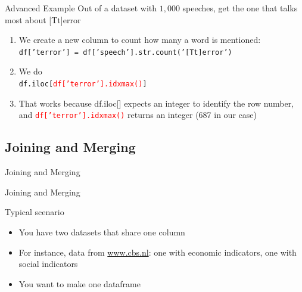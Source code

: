 \documentclass{beamer}
\begin{document}
\begin{frame}{Advanced Example}
Out of a dataset with $1,000$ speeches, get the one that talks most about [Tt]error
\begin{enumerate}[<+->]
	\item We create a new column to count how many a word is mentioned: \\ 
	\texttt{df['terror'] = df['speech'].str.count('[Tt]error')}
	\item We do \\ \texttt{df.iloc[\textcolor{red}{df['terror'].idxmax()}]}
	\item That works because df.iloc[] expects an integer to identify the row number, and \texttt{\textcolor{red}{df['terror'].idxmax()}} returns an integer (687 in our case)
\end{enumerate}

\end{frame}

{
	\begin{frame}[plain]
\end{frame}
}


\subsection{Joining and Merging}
\begin{frame}[plain]
Joining and Merging
\end{frame}


\begin{frame}{Joining and Merging}
\begin{block}{Typical scenario}
	\begin{itemize}
		\item You have two datasets that share one column
		\item For instance, data from \url{www.cbs.nl}: one with economic indicators, one with social indicators
		\item You want to make one dataframe
	\end{itemize}
\end{block}
\end{frame}
\end{document}
